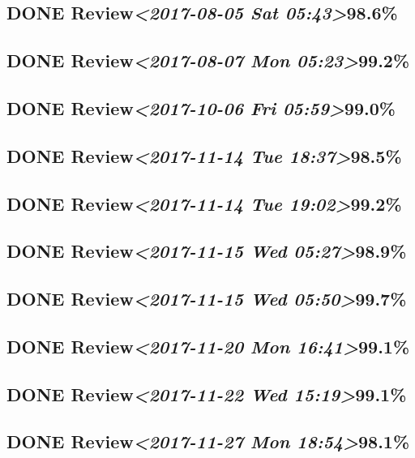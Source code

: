\documentclass[11pt]{ctexart}
\begin{document}
\subsection{{\bfseries\sffamily DONE} Review\textit{<2017-08-05 Sat 05:43>}98.6\%}
\label{sec:org40ee3ee}
\subsection{{\bfseries\sffamily DONE} Review\textit{<2017-08-07 Mon 05:23>}99.2\%}
\label{sec:org44a68d0}
\subsection{{\bfseries\sffamily DONE} Review\textit{<2017-10-06 Fri 05:59>}99.0\%}
\label{sec:org06bab9a}

\subsection{{\bfseries\sffamily DONE} Review\textit{<2017-11-14 Tue 18:37>}98.5\%}
\label{sec:org2413d4f}
\subsection{{\bfseries\sffamily DONE} Review\textit{<2017-11-14 Tue 19:02>}99.2\%}
\label{sec:org3e61260}
\subsection{{\bfseries\sffamily DONE} Review\textit{<2017-11-15 Wed 05:27>}98.9\%}
\label{sec:orgf3b5ced}
\subsection{{\bfseries\sffamily DONE} Review\textit{<2017-11-15 Wed 05:50>}99.7\%}
\label{sec:orgf52dc1e}
\subsection{{\bfseries\sffamily DONE} Review\textit{<2017-11-20 Mon 16:41>}99.1\%}
\label{sec:org5fbdeb1}
\subsection{{\bfseries\sffamily DONE} Review\textit{<2017-11-22 Wed 15:19>}99.1\%}
\label{sec:org5ad95fe}
\subsection{{\bfseries\sffamily DONE} Review\textit{<2017-11-27 Mon 18:54>}98.1\%}
\label{sec:orga502c2c}
\end{document}
